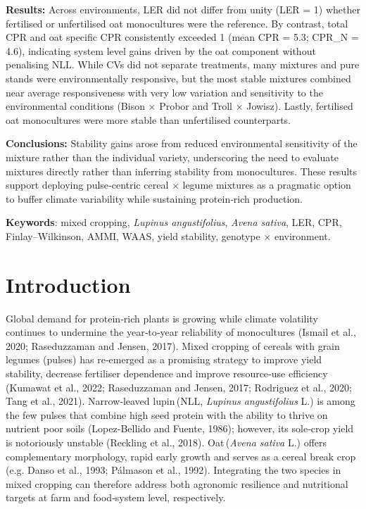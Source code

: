 \documentclass[
  british,
  a4paper,
  DIV=11,
  numbers=noendperiod]{scrreprt}
\begin{document}
\textbf{Results:} Across environments, LER did not differ from unity
(LER = 1) whether fertilised or unfertilised oat monocultures were the
reference. By contrast, total CPR and oat specific CPR consistently
exceeded 1 (mean CPR = 5.3; CPR\_N = 4.6), indicating system level gains
driven by the oat component without penalising NLL. While CVs did not
separate treatments, many mixtures and pure stands were environmentally
responsive, but the most stable mixtures combined near average
responsiveness with very low variation and sensitivity to the
environmental conditions (Bison × Probor and Troll × Jowisz). Lastly,
fertilised oat monocultures were more stable than unfertilised
counterparts.

\textbf{Conclusions:} Stability gains arose from reduced environmental
sensitivity of the mixture rather than the individual variety,
underscoring the need to evaluate mixtures directly rather than
inferring stability from monocultures. These results support deploying
pulse‑centric cereal × legume mixtures as a pragmatic option to buffer
climate variability while sustaining protein‑rich production.

\textbf{Keywords}: mixed cropping, \emph{Lupinus angustifolius},
\emph{Avena sativa}, LER, CPR, Finlay--Wilkinson, AMMI, WAAS, yield
stability, genotype × environment.

\chapter{Introduction}\label{introduction}

Global demand for protein‐rich plants is growing while climate
volatility continues to undermine the year‑to‑year reliability of
monocultures (Ismail et al., 2020; Raseduzzaman and Jensen, 2017). Mixed
cropping of cereals with grain legumes (pulses) has re‑emerged as a
promising strategy to improve yield stability, decrease fertiliser
dependence and improve resource‑use efficiency (Kumawat et al., 2022;
Raseduzzaman and Jensen, 2017; Rodriguez et al., 2020; Tang et al.,
2021). Narrow‑leaved lupin\,(NLL, \emph{Lupinus angustifolius} L.) is
among the few pulses that combine high seed protein with the ability to
thrive on nutrient poor soils (Lopez-Bellido and Fuente, 1986); however,
its sole‑crop yield is notoriously unstable (Reckling et al., 2018).
Oat\,(\emph{Avena sativa} L.) offers complementary morphology, rapid
early growth and serves as a cereal break crop (e.g. Danso et al., 1993;
Pálmason et al., 1992). Integrating the two species in mixed cropping
can therefore address both agronomic resilience and nutritional targets
at farm and food‑system level, respectively.
\end{document}
